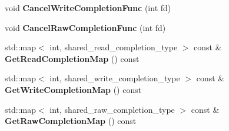 \begin{DoxyCompactItemize}
\item 
\hypertarget{classlsf_1_1asio_1_1async_1_1CompletionQueue_aa22525630051f7e16ec8c97a60ea4c88}{
void {\bfseries CancelWriteCompletionFunc} (int fd)}
\label{classlsf_1_1asio_1_1async_1_1CompletionQueue_aa22525630051f7e16ec8c97a60ea4c88}

\item 
\hypertarget{classlsf_1_1asio_1_1async_1_1CompletionQueue_af6cbdc29f01b9b346f0db4adcadb6bea}{
void {\bfseries CancelRawCompletionFunc} (int fd)}
\label{classlsf_1_1asio_1_1async_1_1CompletionQueue_af6cbdc29f01b9b346f0db4adcadb6bea}

\item 
\hypertarget{classlsf_1_1asio_1_1async_1_1CompletionQueue_ac08299123f7aa24a36d649a7b1345406}{
std::map$<$ int, shared\_\-read\_\-completion\_\-type $>$ const \& {\bfseries GetReadCompletionMap} () const }
\label{classlsf_1_1asio_1_1async_1_1CompletionQueue_ac08299123f7aa24a36d649a7b1345406}

\item 
\hypertarget{classlsf_1_1asio_1_1async_1_1CompletionQueue_ac086fe0222dd5648bce01576d9e83633}{
std::map$<$ int, shared\_\-write\_\-completion\_\-type $>$ const \& {\bfseries GetWriteCompletionMap} () const }
\label{classlsf_1_1asio_1_1async_1_1CompletionQueue_ac086fe0222dd5648bce01576d9e83633}

\item 
\hypertarget{classlsf_1_1asio_1_1async_1_1CompletionQueue_aa49a6887180c67fbf8446a69fb204608}{
std::map$<$ int, shared\_\-raw\_\-completion\_\-type $>$ const \& {\bfseries GetRawCompletionMap} () const }
\label{classlsf_1_1asio_1_1async_1_1CompletionQueue_aa49a6887180c67fbf8446a69fb204608}

\end{DoxyCompactItemize}
